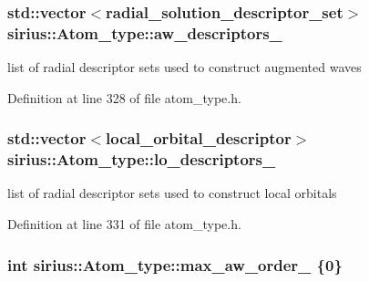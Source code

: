 \subsubsection[{aw\+\_\+descriptors\+\_\+}]{\setlength{\rightskip}{0pt plus 5cm}std\+::vector$<${\bf radial\+\_\+solution\+\_\+descriptor\+\_\+set}$>$ sirius\+::\+Atom\+\_\+type\+::aw\+\_\+descriptors\+\_\+\hspace{0.3cm}{\ttfamily [private]}}\label{classsirius_1_1_atom__type_a8e525b6cc881daedb13d9a882c190873}


list of radial descriptor sets used to construct augmented waves 



Definition at line 328 of file atom\+\_\+type.\+h.

\hypertarget{classsirius_1_1_atom__type_a246365cd7339aec55dd3667359d07497}{}
\subsubsection[{lo\+\_\+descriptors\+\_\+}]{\setlength{\rightskip}{0pt plus 5cm}std\+::vector$<${\bf local\+\_\+orbital\+\_\+descriptor}$>$ sirius\+::\+Atom\+\_\+type\+::lo\+\_\+descriptors\+\_\+\hspace{0.3cm}{\ttfamily [private]}}\label{classsirius_1_1_atom__type_a246365cd7339aec55dd3667359d07497}


list of radial descriptor sets used to construct local orbitals 



Definition at line 331 of file atom\+\_\+type.\+h.

\hypertarget{classsirius_1_1_atom__type_adc566d46112ed3e773d0124abaaa6882}{}
\subsubsection[{max\+\_\+aw\+\_\+order\+\_\+}]{\setlength{\rightskip}{0pt plus 5cm}int sirius\+::\+Atom\+\_\+type\+::max\+\_\+aw\+\_\+order\+\_\+ \{0\}\hspace{0.3cm}{\ttfamily [private]}}\label{classsirius_1_1_atom__type_adc566d46112ed3e773d0124abaaa6882}


